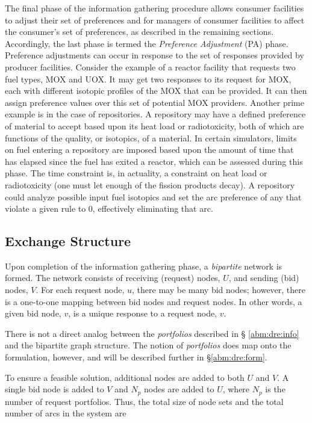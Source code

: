 The final phase of the information gathering procedure allows consumer
facilities to adjust their set of preferences and for managers of consumer
facilities to affect the consumer's set of preferences, as described in the
remaining sections. Accordingly, the last phase is termed the \textit{Preference
 Adjustment} (PA) phase. Preference adjustments can occur in response to the
set of responses provided by producer facilities. Consider the example of a
reactor facility that requests two fuel types, MOX and UOX. It may get two
responses to its request for MOX, each with different isotopic profiles of the
MOX that can be provided. It can then assign preference values over this set of
potential MOX providers. Another prime example is in the case of repositories. A
repository may have a defined preference of material to accept based upon its
heat load or radiotoxicity, both of which are functions of the quality, or
isotopics, of a material. In certain simulators, limits on fuel entering a
repository are imposed based upon the amount of time that has elapsed since the
fuel has exited a reactor, which can be assessed during this phase. The time
constraint is, in actuality, a constraint on heat load or radiotoxicity (one
must let enough of the fission products decay). A repository could analyze
possible input fuel isotopics and set the arc preference of any that violate a
given rule to 0, effectively eliminating that arc.

\subsection{Exchange Structure}

Upon completion of the information gathering phase, a \textit{bipartite} network
is formed. The network consists of receiving (request) nodes, $U$, and sending
(bid) nodes, $V$. For each request node, $u$, there may be many bid nodes;
however, there is a one-to-one mapping between bid nodes and request nodes. In
other words, a given bid node, $v$, is a unique response to a request node, $v$.


There is not a direct analog between the \textit{portfolios} described in \S
\ref{abm:dre:info} and the bipartite graph structure. The notion of
\textit{portfolios} does map onto the formulation, however, and will be
described further in \S \ref{abm:dre:form}.

To ensure a feasible solution, additional nodes are added to both $U$
and $V$. A single bid node is added to $V$ and $N_{p}$ nodes are added to $U$,
where $N_{p}$ is the number of request portfolios. Thus, the total size of node
sets and the total number of arcs in the system are


